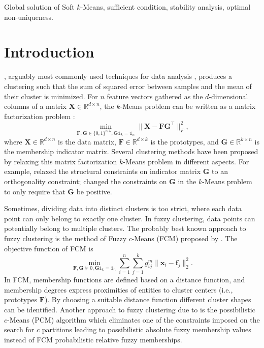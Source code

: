 \documentclass[journal]{IEEEtran}
\begin{document}
\begin{IEEEkeywords}
Global solution of Soft $k$-Means, sufficient condition, stability analysis, optimal non-uniqueness.
\end{IEEEkeywords}

\IEEEpeerreviewmaketitle

\section{Introduction}
 \cite{lloyd1982least}, arguably most commonly used techniques for data analysis \cite{wu2008top}, produces a clustering such that the sum of squared error between samples and the mean of their cluster is minimized. For $n$ feature vectors gathered as the $d$-dimensional columns of a matrix $\mathbf{X}\in\mathbb{R}^{d\times n}$, the $k$-Means problem can be written as a matrix factorization problem \cite{bauckhage2015k}:
\[
\min_{\mathbf{F},\mathbf{G}\in\{0,1\}^{n,k},\mathbf{G}\mathbb{1}_k = \mathbb{1}_n} \| \mathbf{X} - \mathbf{FG}^\top\|_F^2,
\]
where $\mathbf{X}\in\mathbb{R}^{d\times n}$ is the data matrix, $\mathbf{F}\in\mathbb{R}^{d\times k}$ is the prototypes, and $\mathbf{G}\in\mathbb{R}^{k\times n}$ is the membership indicator matrix. 
Several clustering methods have been proposed by relaxing this matrix factorization $k$-Means problem in different aspects.
For example, \cite{zha2002spectral,ding2005equivalence} relaxed the structural constraints on indicator matrix $\mathbf{G}$ to an orthogonality constraint;
\cite{ding2010convex} changed the constraints on $\mathbf{G}$ in the $k$-Means problem to only require that $\mathbf{G}$ be positive.

Sometimes, dividing data into distinct clusters is too strict, where each data point can only belong to exactly one cluster. In fuzzy clustering, data points can potentially belong to multiple clusters.
The probably best known approach to fuzzy clustering is the method of Fuzzy $c$-Means (FCM) proposed by \cite{dunn1973fuzzy}.
The objective function of FCM is
\[
\min_{\mathbf{F},\mathbf{G}\succeq 0,\mathbf{G}\mathbb{1}_k = \mathbb{1}_n} \sum_{i=1}^n \sum_{j=1}^k g_{ij}^m \| \mathbf{x}_i - \mathbf{f}_j\|_2^2.
\]
In FCM, membership functions are defined based on a distance function, and membership degrees express proximities of entities to cluster centers (i.e., prototypes $\mathbf{F}$). By choosing a suitable distance function different cluster shapes can be identified. Another approach to fuzzy clustering due to \cite{krishnapuram1993possibilistic} is the possibilistic $c$-Means (PCM) algorithm which eliminates one of the constraints imposed on the search for $c$ partitions leading to possibilistic absolute fuzzy membership values instead of FCM probabilistic relative fuzzy memberships.
\end{document}
